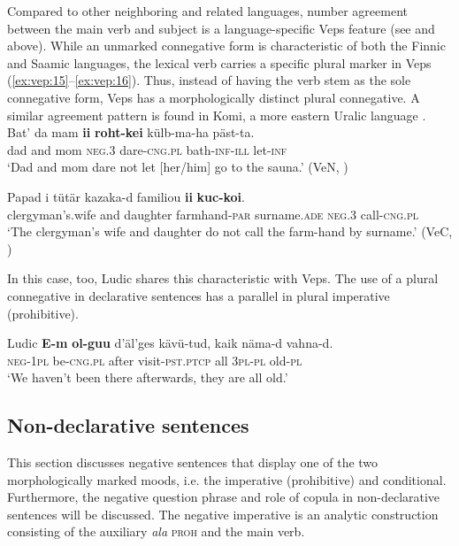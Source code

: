 \documentclass[output=paper,colorlinks=true, citecolor=brown]{langscibook}
\begin{document}
Compared to other neighboring and related languages, number agreement between the main verb and subject is a language-specific Veps feature (see  and  above). While an unmarked connegative form is characteristic of both the Finnic and Saamic languages, the lexical verb carries a specific plural marker in Veps (\ref{ex:vep:15}--\ref{ex:vep:16}). Thus, instead of having the verb stem as the sole connegative form, Veps has a morphologically distinct plural connegative. A similar agreement pattern is found in Komi, a more eastern Uralic language \citep[242, 246--248]{Hamari2015}.
\ea
    \label{ex:vep:15}
    \gll Bat’ da mam \textbf{ii} \textbf{roht{}-kei} külb{}-ma{}-ha päst-ta.\\
         dad and mom \textsc{neg.3} dare-\textsc{cng.pl} bath\textsc{{}-inf}{}-\textsc{ill} let\textsc{{}-inf}\\
    \glt ‘Dad and mom dare not let [her/him] go to the sauna.’ (VeN, \citealt[157]{MSFOu70})
\z 

\ea
    \label{ex:vep:16}
    \gll Papad i tütär kazaka{}-d  familiou \textbf{ii} \textbf{kuc{}-koi}. \\
         clergyman’s.wife and daughter farmhand-\textsc{par} surname.\textsc{ade} \textsc{neg.3} call-\textsc{cng.pl}\\
    \glt ‘The clergyman’s wife and daughter do not call the farm-hand by surname.’ (VeC, \citealt[101]{MSFOu70})
\z

In this case, too, Ludic  shares this characteristic with Veps. The use of a plural connegative in declarative sentences has a parallel in plural imperative (prohibitive).

\ea\label{ex:vep:17} Ludic \newline %
    \gll \textbf{E{}-m} \textbf{ol{}-guu} d’äl’ges kävü-tud, kaik näma{}-d vahna{}-d. \\
         \textsc{neg{}-1pl} be-\textsc{cng.pl} after visit-\textsc{pst.ptcp} all \textsc{3pl-pl} old{}-\textsc{pl}\\
    \glt ‘We haven’t been there afterwards, they are all old.’ \citep[82]{Pahomov2011}
\z

\subsection{Non-declarative sentences}\label{sec:vep:2.2}
\largerpage
This section discusses negative sentences that display one of the two morphologically marked moods, i.e. the imperative (prohibitive) and conditional. Furthermore, the negative question phrase and role of copula in non-declarative sentences will be discussed. The negative imperative is an analytic construction consisting of the auxiliary \textit{ala} \textsc{proh} and the main verb. 
\end{document}
